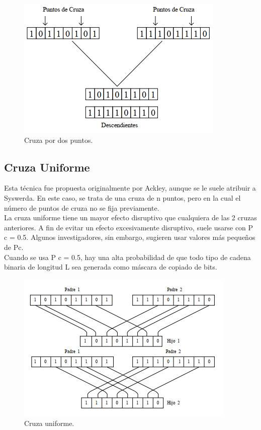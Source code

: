 \documentclass[11pt,letterpaper]{article}
\begin{document}
\begin{figure}[H]
	\centering
	\includegraphics[scale = 0.7]{images/cdp}
	\caption{Cruza por dos puntos.}
\end{figure}

\subsection*{Cruza Uniforme}

Esta técnica fue propuesta originalmente por Ackley, aunque se le suele atribuir a Syswerda. En este caso, se trata de una cruza de n puntos, pero en la cual el número de puntos de cruza no se fija previamente.\\

La cruza uniforme tiene un mayor efecto disruptivo que cualquiera de las 2
cruzas anteriores. A fin de evitar un efecto excesivamente disruptivo, suele usarse
con P c = 0.5. Algunos investigadores, sin embargo, sugieren usar valores más pequeños de Pc.\\

Cuando se usa P c = 0.5, hay una alta probabilidad de que todo tipo de cadena
binaria de longitud L sea generada como máscara de copiado de bits.

\begin{figure}[H]
	\centering
	\includegraphics[scale = 0.7]{images/cu}
	\caption{Cruza uniforme.}
\end{figure}
\end{document}
